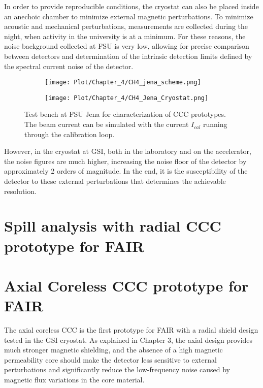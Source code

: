 \documentclass[12pt,a4paper]{report}
\begin{document}
       In order to provide reproducible conditions, the cryostat can also be placed inside an anechoic chamber to minimize external magnetic perturbations. To minimize acoustic and mechanical perturbations, measurements are collected during the night, when activity in the university is at a minimum. For these reasons, the noise background collected at FSU is very low, allowing for precise comparison between detectors and determination of the intrinsic detection limits defined by the spectral current noise of the detector.
       \begin{figure}[H]
       	\begin{subfigure}[b]{0.6\textwidth}
       		\centering
       		\texttt{[image: Plot/Chapter\_4/CH4\_jena\_scheme.png]}
       	\end{subfigure}
       	\hfill
       	\begin{subfigure}[b]{0.35\textwidth}
       		\centering
       		\texttt{[image: Plot/Chapter\_4/CH4\_Jena\_Cryostat.png]}
       	\end{subfigure}
       	\caption{\small{Test bench at FSU Jena for characterization of CCC prototypes. The beam current can be simulated with the current $I_{cal}$ running through the calibration loop.}}
       	\label{CH4_jena_cryostat}
       \end{figure}
       However, in the cryostat at GSI, both in the laboratory and on the accelerator, the noise figures are much higher, increasing the noise floor of the detector by approximately 2 orders of magnitude. In the end, it is the susceptibility of the detector to these external perturbations that determines the achievable resolution.
       
       
       
       
        \chapter{Spill analysis with radial CCC prototype for FAIR}
        \chapter{Axial Coreless CCC prototype for FAIR}
        The axial coreless CCC is the first prototype for FAIR with a radial shield design tested in the GSI cryostat. As explained in Chapter 3, the axial design provides much stronger magnetic shielding, and the absence of a high magnetic permeability core should make the detector less sensitive to external perturbations and significantly reduce the low-frequency noise caused by magnetic flux variations in the core material.
        
\end{document}
